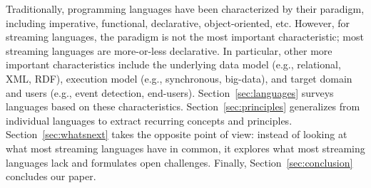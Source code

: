 Traditionally, programming languages have been characterized by their
paradigm, including imperative, functional, declarative,
object-oriented, etc. However, for streaming languages, the paradigm
is not the most important characteristic; most streaming languages are
more-or-less declarative. In particular, other more important characteristics include the underlying
data model (e.g., relational, XML, RDF), execution model (e.g.,
synchronous, big-data), and target domain and users (e.g., event
detection, end-users).  Section~\ref{sec:languages} surveys languages
based on these characteristics. Section~\ref{sec:principles} generalizes from individual languages to
extract recurring concepts and principles. Section~\ref{sec:whatsnext}
takes the opposite point of view: instead of looking at what most
streaming languages have in common, it explores what most streaming
languages lack and formulates open challenges. Finally,
Section~\ref{sec:conclusion} concludes our paper.
